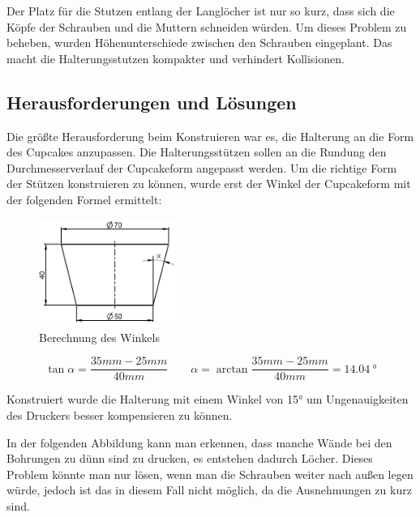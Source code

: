 	Der Platz für die Stutzen entlang der Langlöcher ist nur so kurz, dass sich die Köpfe der Schrauben und die Muttern schneiden würden.
	Um dieses Problem zu beheben, wurden Höhenunterschiede zwischen den Schrauben eingeplant.
	Das macht die Halterungsstutzen kompakter und verhindert Kollisionen.

	\subsection{Herausforderungen und Lösungen}

	Die größte Herausforderung beim Konstruieren war es, die Halterung an die Form des Cupcakes anzupassen.
	Die Halterungsstützen sollen an die Rundung \bzw den Durchmesserverlauf der Cupcakeform angepasst werden.
	Um die richtige Form der Stützen konstruieren zu können, wurde erst der Winkel der Cupcakeform mit der  folgenden Formel ermittelt:

			\begin{figure}[H]
			\begin{centering}
			\includegraphics[width = 0.4\textwidth]{Bilder/berechnung_winkel}
			\par\end{centering}
			\caption{Berechnung des Winkels}
			\label{berechnung_winkel}
			\end{figure}

			\[
 				\tan \alpha = \frac{35mm-25mm}{40mm}  \qquad \alpha = \arctan \frac{35mm-25mm}{40mm} = \SI{14.04}{\degree}
 			\]

	Konstruiert wurde die Halterung mit einem Winkel von 15° um Ungenauigkeiten des Druckers besser kompensieren zu können.

	In der folgenden Abbildung kann man erkennen, dass manche Wände bei den Bohrungen zu dünn sind zu drucken, es entstehen dadurch Löcher.
	Dieses Problem könnte man nur lösen, wenn man die Schrauben weiter nach außen legen würde, jedoch ist das in diesem Fall nicht möglich, da die Ausnehmungen zu kurz sind.


